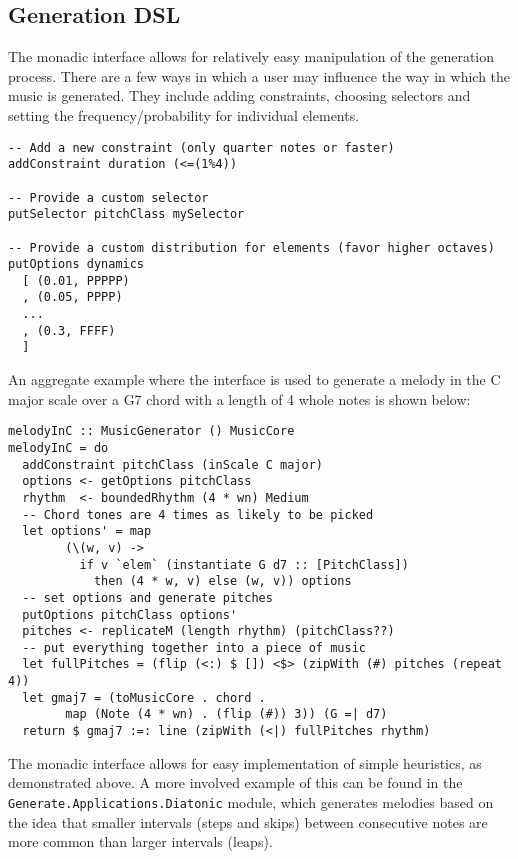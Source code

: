 \documentclass[11pt,a4paper]{article}
\newcommand{\icode}[1]{\texttt{#1}}
\begin{document}
\subsection{Generation DSL}
The monadic interface allows for relatively easy manipulation of the generation process. There are a few ways in which a user may influence the way in which the music is generated. They include adding constraints, choosing selectors and setting the frequency/probability for individual elements.

\begin{verbatim}
-- Add a new constraint (only quarter notes or faster)
addConstraint duration (<=(1%4))

-- Provide a custom selector
putSelector pitchClass mySelector

-- Provide a custom distribution for elements (favor higher octaves)
putOptions dynamics
  [ (0.01, PPPPP)
  , (0.05, PPPP)
  ...
  , (0.3, FFFF)
  ]
\end{verbatim}

An aggregate example where the interface is used to generate a melody in the C major scale over a G7 chord with a length of 4 whole notes is shown below:

\begin{verbatim}
melodyInC :: MusicGenerator () MusicCore
melodyInC = do
  addConstraint pitchClass (inScale C major)
  options <- getOptions pitchClass
  rhythm  <- boundedRhythm (4 * wn) Medium
  -- Chord tones are 4 times as likely to be picked
  let options' = map
        (\(w, v) ->
          if v `elem` (instantiate G d7 :: [PitchClass])
            then (4 * w, v) else (w, v)) options
  -- set options and generate pitches
  putOptions pitchClass options'
  pitches <- replicateM (length rhythm) (pitchClass??)
  -- put everything together into a piece of music
  let fullPitches = (flip (<:) $ []) <$> (zipWith (#) pitches (repeat 4))
  let gmaj7 = (toMusicCore . chord .
        map (Note (4 * wn) . (flip (#)) 3)) (G =| d7)
  return $ gmaj7 :=: line (zipWith (<|) fullPitches rhythm)
\end{verbatim}

The monadic interface allows for easy implementation of simple heuristics, as demonstrated above. A more involved example of this can be found in the \icode{Generate.Applications.Diatonic} module, which generates melodies based on the idea that smaller intervals (steps and skips) between consecutive notes are more common than larger intervals (leaps).
\end{document}
